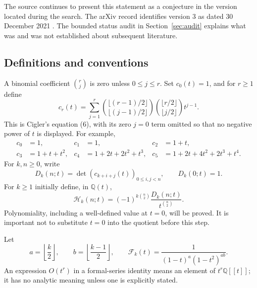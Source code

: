 \documentclass[11pt]{article}
\theoremstyle{definition}
\theoremstyle{remark}
\newcommand{\Q}{\mathbb Q}
\newcommand{\Ht}{\mathcal H}
\newcommand{\F}{\mathcal F}
\numberwithin{equation}{section}
\begin{document}
The source continues to present this statement as a conjecture in the
version located during the search. The arXiv record identifies version 3
as dated 30 December 2021 \cite{Cigler}. The bounded status audit in
Section~\ref{sec:audit} explains what was and was not established about
subsequent literature.

\subsection{Definitions and conventions}
A binomial coefficient $\binom rj$ is zero unless $0\le j\le r$.
Set $c_0(t)=1$, and for $r\ge1$ define
\begin{equation}
 c_r(t)=\sum_{j=1}^{r}
 \binom{\lfloor(r-1)/2\rfloor}{\lfloor(j-1)/2\rfloor}
 \binom{\lfloor r/2\rfloor}{\lfloor j/2\rfloor}t^{j-1}.
 \label{eq:source-moments}
\end{equation}
This is Cigler's equation (6), with its zero $j=0$ term omitted so that no
negative power of $t$ is displayed. For example,
\begin{align*}
 c_0&=1,&c_1&=1,&c_2&=1+t,\\
 c_3&=1+t+t^2,&
 c_4&=1+2t+2t^2+t^3,&
 c_5&=1+2t+4t^2+2t^3+t^4.
\end{align*}
For $k,n\ge0$, write
\begin{equation}
 D_k(n;t)=\det(c_{k+i+j}(t))_{0\le i,j<n},\qquad D_k(0;t)=1.
 \label{eq:D}
\end{equation}
For $k\ge1$ initially define, in $\Q(t)$,
\begin{equation}
 \Ht_k(n;t)=(-1)^{k\binom n2}\frac{D_k(n;t)}{t^{\binom n2}}.
 \label{eq:normalization}
\end{equation}
Polynomiality, including a well-defined value at $t=0$, will be proved.
It is important not to substitute $t=0$ into the quotient before this step.

Let
\begin{equation}
 a=\left\lfloor\frac k2\right\rfloor,\qquad
 b=\left\lfloor\frac{k-1}{2}\right\rfloor,\qquad
 \F_k(t)=\frac{1}{(1-t)^a(1-t^2)^{ab}}.
 \label{eq:F}
\end{equation}
An expression $O(t^r)$ in a formal-series identity means an element of
$t^r\Q[[t]]$; it has no analytic meaning unless one is explicitly stated.
\end{document}
